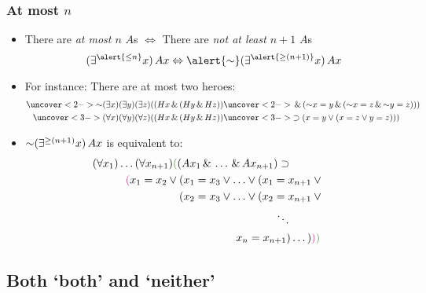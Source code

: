 \begin{frame}
    \frametitle{At most $n$}

\begin{itemize}
\item<1-> There are \emph{at most $n$} $A$s $\Leftrightarrow$ There are
\emph{not at least $n+1$} $A$s
\[
\qt{\exists^{\alert{\le n}}}{x}\, A\qv{x} \Leftrightarrow \alert{\lnot} \qt{\exists^{\alert{\ge(n+1)}}}{x} \, A\qv{x}
\]
\item<2-> For instance: There are at most two heroes:
\begin{align*}
\uncover<2->{\lnot \qt{\exists}{x}\qt{\exists}{y}\qt{\exists}{z}((H\qv{x} \land (H\qv{y} \land H\qv{z}))}
& \uncover<2->{\land (\lnot x =y \land (\lnot x = z \land \lnot y = z)) )}\\
\uncover<3->{\qt{\forall}{x}\qt{\forall}{y}\qt{\forall}{z}((H\qv{x} \land (H\qv{y} \land H\qv{z}))
} &\uncover<3->{\eif (x =y \lor ( x = z \lor y = z)) )}
\end{align*}
\item<4-> $\lnot \qt{\exists^{\ge(n+1)}}{x} \, A\qv{x}$ is equivalent to:
\begin{align*}
\qt{\forall}{x_1}\dots\qt{\forall}{x_{n+1}} \textcolor{highlightA}{(}(A\qv{x_1} \land \dots \land A\qv{x_{n+1}}) \eif \qquad \\
\textcolor{OGlyallpink}{(}x_1 = x_2 \lor (x_1 = x_3 \lor \dots \lor (x_1 = x_{n+1} & {} \lor {}\\
(x_2 = x_3 \lor \dots \lor (x_2 = x_{n+1} & {} \lor {}\\
\ddots\qquad &\\
x_n = x_{n+1})\dots) & \textcolor{OGlyallpink}{)}\textcolor{highlightA}{)}
\end{align*}
\end{itemize}
\end{frame}

\subsection{Both `both' and `neither'}

